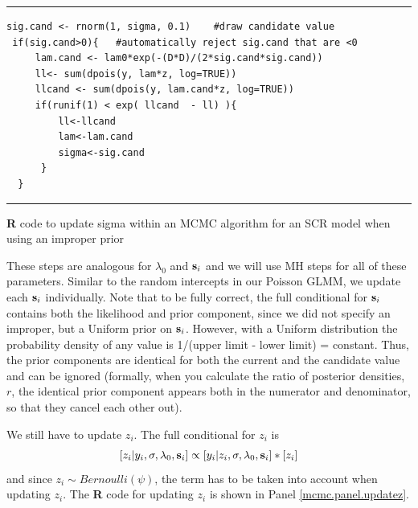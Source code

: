 \begin{panel}[htp]
\centering
\rule[0.15in]{\textwidth}{.03in}
{\small
\begin{verbatim}
sig.cand <- rnorm(1, sigma, 0.1)	#draw candidate value
 if(sig.cand>0){   #automatically reject sig.cand that are <0
     lam.cand <- lam0*exp(-(D*D)/(2*sig.cand*sig.cand))
     ll<- sum(dpois(y, lam*z, log=TRUE))
     llcand <- sum(dpois(y, lam.cand*z, log=TRUE))
     if(runif(1) < exp( llcand  - ll) ){
         ll<-llcand
         lam<-lam.cand
         sigma<-sig.cand
      }
  }
\end{verbatim}
}
\rule[-0.15in]{\textwidth}{.03in}
\caption{
{\bf R} code to update sigma within an MCMC algorithm for
an SCR model when using an improper prior
}
\label{mcmc.panel.updatesigma}
\end{panel}


These steps are analogous for  $\lambda_{0}$ and ${\bf s}_i$ and we will 
use MH steps for
all of these parameters. Similar to the random intercepts in our
Poisson GLMM, we update each ${\bf s}_i$ individually. Note that to be fully
correct, the full conditional for ${\bf s}_i$ contains both the likelihood and
prior component, since we did not specify an improper, but a Uniform
prior on ${\bf s}_i$. However, with a Uniform distribution the probability
density of any value is 1/(upper limit - lower limit) =
constant. Thus, the prior components are identical for both the
current and the candidate value and can be ignored (formally, when you
calculate the ratio of posterior densities, $r$, the identical prior
component appears both in the numerator and denominator, so that they
cancel each other out).

We still have to update $z_i$. The full conditional for $z_i$ is
\[
[z_i|y_{i}, \sigma, \lambda_0, {\bf s}_{i}] \propto [y_{i}|z_{i},\sigma, \lambda_0, 
{\bf s}_{i}] * [z_i]
\]
and since $z_i \sim Bernoulli(\psi)$,
the term has to be taken into account when updating $z_i$. The 
{\bf R} code for updating $z_i$ is shown in Panel \ref{mcmc.panel.updatez}.


